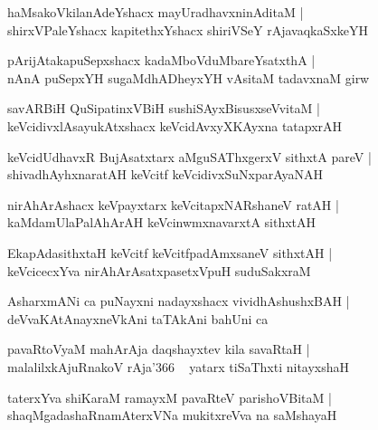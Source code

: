 \documentclass[twoside,12pt,openright]{book}
\newcounter{shloka}[chapter]
\begin{document}
\begin{shloka}%
haMsakoVkilanAdeYshacx mayUradhavxninAditaM |\\
shirxVPaleYshacx kapitethxYshacx shiriVSeY rAjavaqkaSxkeYH 
\end{shloka}

\begin{shloka}%
pArijAtakapuSepxshacx kadaMboVduMbareYsatxthA |\\
nAnA puSepxYH sugaMdhADheyxYH vAsitaM tadavxnaM girw
\end{shloka}

\begin{shloka}%
savARBiH QuSipatinxVBiH sushiSAyxBisusxseVvitaM |\\
keVcidivxlAsayukAtxshacx keVcidAvxyXKAyxna tatapxrAH 
\end{shloka}

\begin{shloka}%
keVcidUdhavxR BujAsatxtarx aMguSAThxgerxV sithxtA pareV |\\
shivadhAyhxnaratAH keVcitf keVcidivxSuNxparAyaNAH
\end{shloka}

\begin{shloka}%
nirAhArAshacx keVpayxtarx keVcitapxNARshaneV ratAH |\\
kaMdamUlaPalAhArAH keVcinwmxnavarxtA sithxtAH 
\end{shloka}

\begin{shloka}%
EkapAdasithxtaH keVcitf keVcitfpadAmxsaneV sithxtAH |\\
keVcicecxYva nirAhArAsatxpasetxVpuH suduSakxraM 
\end{shloka}

\begin{shloka}%
AsharxmANi ca puNayxni nadayxshacx vividhAshushxBAH |\\
deVvaKAtAnayxneVkAni taTAkAni bahUni ca 
\end{shloka}

\begin{shloka}%
pavaRtoVyaM mahArAja daqshayxtev kila savaRtaH |\\
malalilxkAjuRnakoV rAja\char'366 ~ yatarx tiSaThxti nitayxshaH 
\end{shloka}

\begin{shloka}%
taterxYva shiKaraM ramayxM pavaRteV parishoVBitaM |\\
shaqMgadashaRnamAterxVNa mukitxreVva na saMshayaH
\end{shloka}
\end{document}
